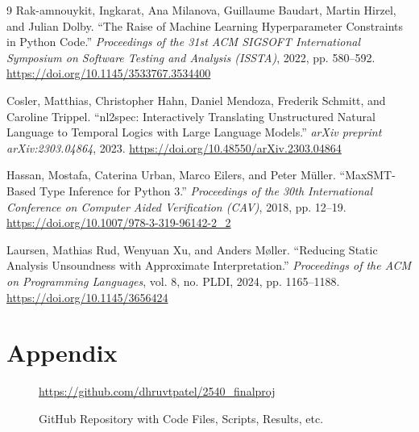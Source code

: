 \documentclass[8pt]{extarticle}
\begin{document}
\begin{thebibliography}{9}
 Rak-amnouykit, Ingkarat, Ana Milanova, Guillaume Baudart, Martin Hirzel, and Julian Dolby. ``The Raise of Machine Learning Hyperparameter Constraints in Python Code.'' \textit{Proceedings of the 31st ACM SIGSOFT International Symposium on Software Testing and Analysis (ISSTA)}, 2022, pp. 580--592. \url{https://doi.org/10.1145/3533767.3534400}

 Cosler, Matthias, Christopher Hahn, Daniel Mendoza, Frederik Schmitt, and Caroline Trippel. ``nl2spec: Interactively Translating Unstructured Natural Language to Temporal Logics with Large Language Models.'' \textit{arXiv preprint arXiv:2303.04864}, 2023. \url{https://doi.org/10.48550/arXiv.2303.04864}

 Hassan, Mostafa, Caterina Urban, Marco Eilers, and Peter Müller. ``MaxSMT-Based Type Inference for Python 3.'' \textit{Proceedings of the 30th International Conference on Computer Aided Verification (CAV)}, 2018, pp. 12--19. \url{https://doi.org/10.1007/978-3-319-96142-2_2}

 Laursen, Mathias Rud, Wenyuan Xu, and Anders Møller. ``Reducing Static Analysis Unsoundness with Approximate Interpretation.'' \textit{Proceedings of the ACM on Programming Languages}, vol. 8, no. PLDI, 2024, pp. 1165--1188. \url{https://doi.org/10.1145/3656424}

\end{thebibliography}

\section*{Appendix}

\begin{figure}[H]
    \centering
    \href{https://github.com/dhruvtpatel/2540_finalproj}{\url{https://github.com/dhruvtpatel/2540_finalproj}}
    \caption{GitHub Repository with Code Files, Scripts, Results, etc.}
    \label{fig:enter-label}
\end{figure}
\end{document}
